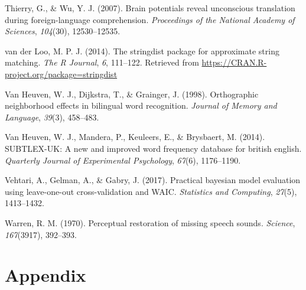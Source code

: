 \documentclass[
  english,
  man,floatsintext]{apa6}
\newlength{\cslhangindent}
\newenvironment{CSLReferences}[2] %
 {%
  \setlength{\parindent}{0pt}
  \ifodd #1 \everypar{\setlength{\hangindent}{\cslhangindent}}\ignorespaces\fi
  \ifnum #2 > 0
  \setlength{\parskip}{#2\baselineskip}
  \fi
 }%
 {}
\begin{document}
\begin{CSLReferences}{1}{0}
\leavevmode{}%
Thierry, G., \& Wu, Y. J. (2007). Brain potentials reveal unconscious translation during foreign-language comprehension. \emph{Proceedings of the National Academy of Sciences}, \emph{104}(30), 12530--12535.

\leavevmode{}%
van der Loo, M. P. J. (2014). The stringdist package for approximate string matching. \emph{The {R} {J}ournal}, \emph{6}, 111--122. Retrieved from \url{https://CRAN.R-project.org/package=stringdist}

\leavevmode{}%
Van Heuven, W. J., Dijkstra, T., \& Grainger, J. (1998). Orthographic neighborhood effects in bilingual word recognition. \emph{Journal of Memory and Language}, \emph{39}(3), 458--483.

\leavevmode{}%
Van Heuven, W. J., Mandera, P., Keuleers, E., \& Brysbaert, M. (2014). SUBTLEX-UK: A new and improved word frequency database for british english. \emph{Quarterly Journal of Experimental Psychology}, \emph{67}(6), 1176--1190.

\leavevmode{}%
Vehtari, A., Gelman, A., \& Gabry, J. (2017). Practical bayesian model evaluation using leave-one-out cross-validation and WAIC. \emph{Statistics and Computing}, \emph{27}(5), 1413--1432.

\leavevmode{}%
Warren, R. M. (1970). Perceptual restoration of missing speech sounds. \emph{Science}, \emph{167}(3917), 392--393.

\end{CSLReferences}

\endgroup

\newpage

\hypertarget{appendix}{%
\section{Appendix}\label{appendix}}
\end{document}
